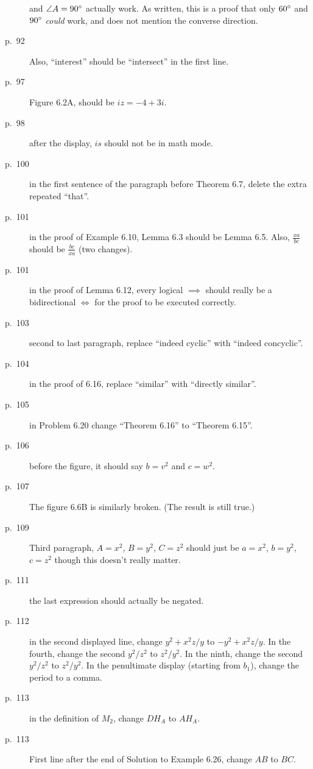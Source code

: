 \documentclass[11pt]{scrartcl}
\begin{document}
\begin{description}
  and $\angle A = 90^\circ$ actually work.
  As written, this is a proof that only $60^\circ$ and $90^\circ$ \emph{could} work,
  and does not mention the converse direction.
\item[p.\  92] 
  Also, ``interest'' should be ``intersect'' in the first line.
\item[p.\  97] Figure 6.2A, should be $iz = -4+3i$.
\item[p.\  98] after the display, $is$ should not be in math mode.
\item[p.\  100] in the first sentence of the paragraph before Theorem 6.7,
  delete the extra repeated ``that''.
\item[p.\  101] in the proof of Example 6.10, Lemma 6.3 should be Lemma 6.5.
  Also, $\frac{xa}{bc}$ should be $\frac{bc}{xa}$ (two changes).
\item[p.\  101] in the proof of Lemma 6.12, every logical $\implies$ should
  really be a bidirectional $\iff$ for the proof to be executed correctly.
\item[p.\  103] second to last paragraph, replace ``indeed cyclic'' with ``indeed concyclic''.
\item[p.\  104] in the proof of 6.16, replace ``similar'' with ``directly similar''.
\item[p.\  105] in Problem 6.20 change ``Theorem 6.16'' to ``Theorem 6.15''.
\item[p.\  106] before the figure, it should say $b = v^2$ and $c = w^2$.
\item[p.\  107] 
  The figure 6.6B is similarly broken.
  (The result is still true.)
\item[p.\  109] Third paragraph, $A=x^2$, $B=y^2$, $C=z^2$
  should just be $a=x^2$, $b=y^2$, $c=z^2$ though this doesn't really matter.
\item[p.\  111] the last expression should actually be negated.
\item[p.\  112] in the second displayed line, change $y^2+x^2z/y$ to $-y^2+x^2z/y$.
  In the fourth, change the second $y^2/z^2$ to $z^2/y^2$.
  In the ninth, change the second $y^2/z^2$ to $z^2/y^2$.
  In the penultimate display (starting from $b_1$), change the period to a comma.
\item[p.\  113] in the definition of $M_2$, change $DH_A$ to $AH_A$.
\item[p.\  113] First line after the end of Solution to Example 6.26,  change $AB$ to $BC$.

\end{description}
\end{document}
